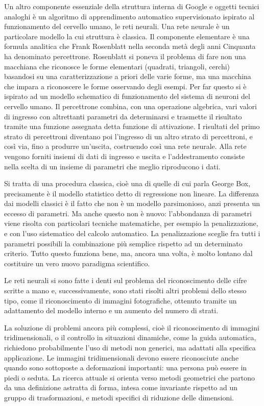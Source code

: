 \documentclass[xcolor=svgnames]{beamer}
\begin{document}
\begin{frame}
\begin{itemize}
Un altro componente essenziale della struttura interna di Google e oggetti tecnici analoghi è un algoritmo di apprendimento automatico supervisionato ispirato al funzionamento del cervello umano, le reti neurali. Una rete neurale è un particolare modello la cui struttura è classica. Il componente elementare è una formula analitica che Frank Rosenblatt nella seconda metà degli anni Cinquanta ha denominato percettrone. Rosenblatt si poneva il problema di fare non una macchiana che riconosce le forme elementari (quadrati, triangoli, cerchi) basandosi su una caratterizzazione a priori delle varie forme, ma una macchina che impara a riconoscere le forme osservando degli esempi. Per far questo si è ispirato ad un modello schematico di funzionamento del sistema di neuroni del cervello umano. Il percettrone combina, con una operazione algebrica, vari valori di ingresso con altrettanti parametri da determinarsi e trasmette il risultato tramite una funzione assegnata detta funzione di attivazione. I risultati del primo strato di percettroni diventano poi l'ingresso di un altro strato di percettroni, e così via, fino a produrre un'uscita, costruendo così una rete neurale. Alla rete vengono forniti insiemi di dati di ingresso e uscita e l'addestramento consiste nella scelta di un insieme di parametri che meglio riproducono i dati.

Si tratta di una procedura classica, cioè una di quelle di cui parla George Box, precisamente è il modello statistico detto di regressione non lineare. La differenza dai modelli classici è il fatto che non è un modello parsimonioso, anzi presenta un eccesso di parametri. Ma anche questo non è nuovo: l'abbondanza di parametri viene risolta con particolari tecniche matematiche, per esempio la penalizzazione, e con l'uso sistematico del calcolo automatico. La penalizzazione sceglie fra tutti i parametri possibili la combinazione più semplice rispetto ad un determinato criterio. Tutto questo funziona bene, ma, ancora una volta, è molto lontano dal costituire un vero nuovo paradigma scientifico.

Le reti neurali si sono fatte i denti sul problema del riconoscimento delle cifre scritte a mano e, successivamente, sono stati risolti altri problemi dello stesso tipo, come il riconoscimento di immagini fotografiche, ottenuto tramite un adattamento del modello interno e un aumento del numero di strati.

La soluzione di problemi ancora più complessi, cioè il riconoscimento di immagini tridimensionali, o il controllo in situazioni dinamiche, come la guida automatica, richiedono probabilmente l'uso di metodi non generici, ma adattati alla specifica applicazione. Le immagini tridimensionali devono essere riconosciute anche quando sono sottoposte a deformazioni importanti: una persona può essere in piedi o seduta. La ricerca attuale si orienta verso metodi geometrici che partono da una definizione astratta di forma, intesa come invariante rispetto ad un gruppo di trasformazioni, e metodi specifici di riduzione delle dimensioni.


\end{itemize}
\end{frame}
\end{document}
